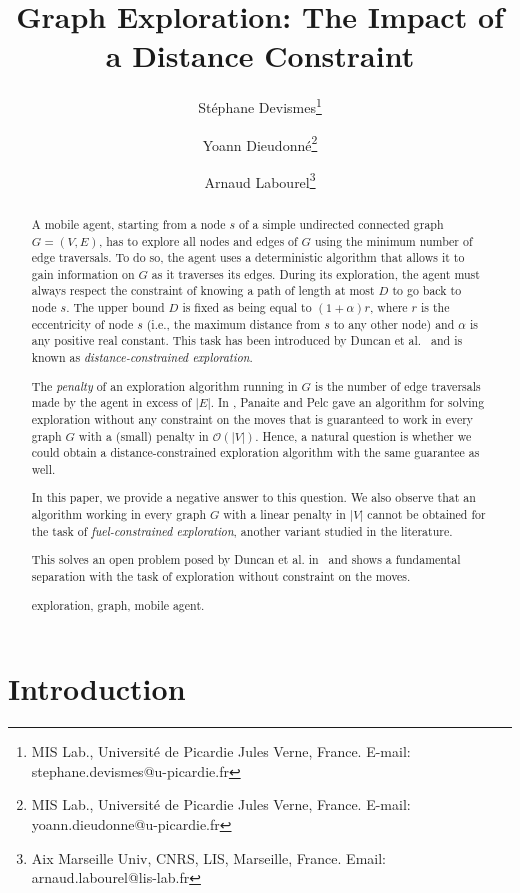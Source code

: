 \documentclass[11pt]{article}
\title{{\bf Graph Exploration: The Impact of a Distance Constraint}}
\author{
St\'ephane Devismes\thanks{
MIS Lab., Universit\'{e} de Picardie Jules Verne, France. E-mail: stephane.devismes@u-picardie.fr}
\and
Yoann Dieudonn\'{e}\thanks{
MIS Lab., Universit\'{e} de Picardie Jules Verne, France. E-mail: yoann.dieudonne@u-picardie.fr}
\and
Arnaud Labourel\thanks{
Aix Marseille Univ, CNRS, LIS, Marseille, France. Email: arnaud.labourel@lis-lab.fr}
}
\date{ }
\begin{document}
\sloppy
\maketitle
\begin{abstract}
A mobile agent, starting from a node $s$ of a simple undirected
connected graph $G=(V,E)$, has to explore all nodes and edges of $G$
using the minimum number of edge traversals. To do so, the agent uses a deterministic algorithm that allows it to gain information on $G$ as it traverses its edges. 
During its exploration, the agent must
always respect the constraint of knowing a path of length at most $D$
to go back to node $s$. The upper bound $D$ is fixed as being equal to
$(1+\alpha)r$, where $r$ is the eccentricity of node $s$ (i.e., the
maximum distance from $s$ to any other node) and $\alpha$ is any
positive real constant. This task has been introduced by Duncan et
al.~\cite{DuncanKK06} and is known as \emph{distance-constrained
exploration}.

The \emph{penalty} of an exploration algorithm running in $G$ is the
number of edge traversals made by the agent in excess of $|E|$. In
\cite{PanaiteP99}, Panaite and Pelc gave an algorithm for solving
exploration without any constraint on the moves that is guaranteed to
work in every graph $G$ with a (small) penalty in
$\mathcal{O}(|V|)$. Hence, a natural question is whether we could
obtain a distance-constrained exploration algorithm with the same
guarantee as well.

In this paper, we provide a negative answer to this question. We also
observe that an algorithm working in every graph $G$ with a linear
penalty in $|V|$ cannot be obtained for the task of
\emph{fuel-constrained exploration}, another variant studied in the
literature.

This solves an open problem posed by Duncan et
al. in~\cite{DuncanKK06} and shows a fundamental separation with the
task of exploration without constraint on the moves.
\vspace*{1cm}

 exploration, graph, mobile agent.

\vspace*{2cm}
\end{abstract}

\pagebreak

\section{Introduction}
\end{document}
